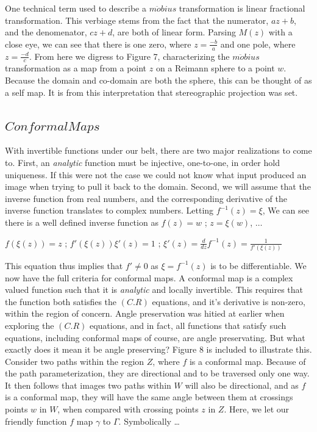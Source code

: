 \documentclass[a4paper,man,natbib]{apa6}
\begin{document}
One technical term used to describe a $ m\ddot{o}bius $ transformation is linear fractional transformation. 
This verbiage stems from the fact that the numerator, $ az + b $, and the denomenator, $ cz + d $, are both of linear form.
Parsing $ M(z) $ with a close eye, we can see that there is one zero, where $ z = \frac{-b}{a} $ and one pole, where $ z = \frac{-d}{c} $.
From here we digress to Figure 7, characterizing the $ m\ddot{o}bius $ transformation as a map from a point $ z $ on a Reimann sphere to a point $ w $.
Because the domain and co-domain are both the sphere, this can be thought of as a self map. It is from this interpretation that stereographic projection was set. 

\subsection{$ Conformal Maps $}

With invertible functions under our belt, there are two major realizations to come to.
First, an \textit{analytic} function must be injective, one-to-one, in order hold uniqueness. 
If this were not the case we could not know what input produced an image when trying to pull it back to the domain.
Second, we will assume that the inverse function from real numbers, and the corresponding derivative of the inverse function translates to complex numbers.
Letting $ f^{-1}(z) = \xi $, We can see there is a well defined inverse function as $ f(z) = w $ ; $ z = \xi(w) $, $ \dots $ 

\begin{center}

      $ f(\xi(z)) = z $ ; $ f'(\xi(z))\xi'(z) = 1 $ ; $ \xi'(z) = \frac{d}{dz}f^{-1}(z) = \frac{1}{f'(\xi(z))} $

\end{center}

This equation thus implies that $ f' \neq 0 $ as $ \xi = f^{-1}(z) $ is to be differentiable. We now have the full criteria for conformal maps. 
A conformal map is a complex valued function such that it is \textit{analytic} and locally invertible. 
This requires that the function both satisfies the $ (C.R) $ equations, and it's derivative is non-zero, within the region of concern. 
Angle preservation was hitied at earlier when exploring the $ (C.R) $ equations, and in fact, all functions that satisfy such equations, including conformal maps of course, are angle preservating.
But what exactly does it mean it be angle preserving? Figure 8 is included to illustrate this.
Consider two paths within the region $ Z $, where $ f $ is a conformal map. Because of the path parameterization, they are directional and to be traversed only one way. 
It then follows that images two paths within $ W $ will also be directional, and as $ f $ is a conformal map, 
they will have the same angle between them at crossings points $ w $ in $ W $, when compared with crossing points $ z $ in $ Z $.
Here, we let our friendly function $ f $ map $ \gamma $ to $ \Gamma $. Symbolically \dots
\end{document}
